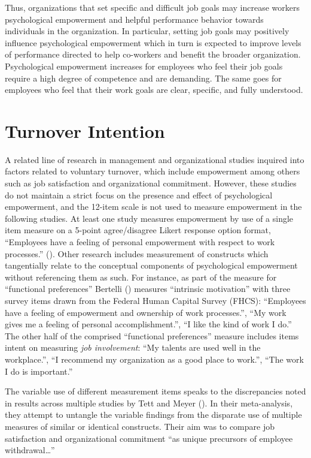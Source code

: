 \documentclass[
  11pt,
  a4paper,
]{article}
\begin{document}
Thus, organizations that set specific and difficult job goals may
increase workers psychological empowerment and helpful performance
behavior towards individuals in the organization. In particular, setting
job goals may positively influence psychological empowerment which in
turn is expected to improve levels of performance directed to help
co-workers and benefit the broader organization. Psychological
empowerment increases for employees who feel their job goals require a
high degree of competence and are demanding. The same goes for employees
who feel that their work goals are clear, specific, and fully
understood.

\section{Turnover Intention}\label{turnover-intention}

A related line of research in management and organizational studies
inquired into factors related to voluntary turnover, which include
empowerment among others such as job satisfaction and organizational
commitment. However, these studies do not maintain a strict focus on the
presence and effect of psychological empowerment, and the 12-item scale
is not used to measure empowerment in the following studies. At least
one study measures empowerment by use of a single item measure on a
5-point agree/disagree Likert response option format, ``Employees have a
feeling of personal empowerment with respect to work processes.''
(). Other
research includes measurement of constructs which tangentially relate to
the conceptual components of psychological empowerment without
referencing them as such. For instance, as part of the measure for
``functional preferences'' Bertelli ()
measures ``intrinsic motivation'' with three survey items drawn from the
Federal Human Capital Survey (FHCS): ``Employees have a feeling of
empowerment and ownership of work processes.'', ``My work gives me a
feeling of personal accomplishment.'', ``I like the kind of work I do.''
The other half of the comprised ``functional preferences'' measure
includes items intent on measuring \emph{job involvement}: ``My talents
are used well in the workplace.'', ``I recommend my organization as a
good place to work.'', ``The work I do is important.''

The variable use of different measurement items speaks to the
discrepancies noted in results across multiple studies by Tett and Meyer
(). In their meta-analysis, they attempt to
untangle the variable findings from the disparate use of multiple
measures of similar or identical constructs. Their aim was to compare
job satisfaction and organizational commitment ``as unique precursors of
employee withdrawal\ldots{}''
\end{document}
